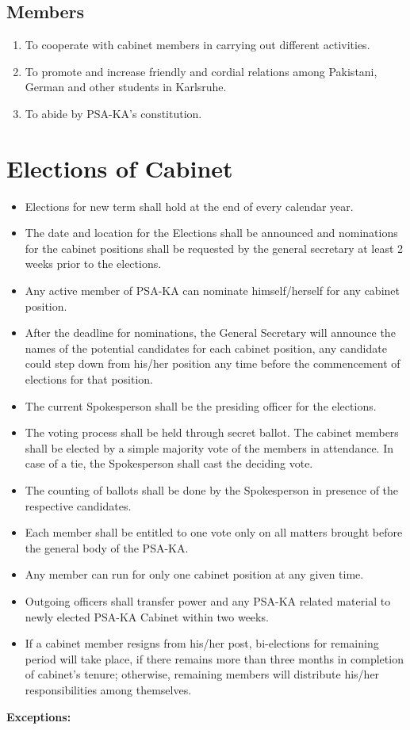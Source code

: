 \subsection{Members }
\begin{enumerate}
	\item To cooperate with cabinet members in carrying out different activities. 
	\item To promote and increase friendly and cordial relations among Pakistani, German and other students in Karlsruhe. 
	\item To abide by PSA-KA’s constitution. 
\end{enumerate}
\section{Elections of Cabinet }
\begin{itemize}
	\item Elections for new term shall hold at the end of every calendar year. 
	\item The date and location for the Elections shall be announced and nominations for the cabinet positions shall be requested by the general secretary at least 2 weeks prior to the elections. 
	\item Any active member of PSA-KA can nominate himself/herself for any cabinet position. 
	\item After the deadline for nominations, the General Secretary will announce the names of the potential candidates for each cabinet position, any candidate could step down from his/her position any time before the commencement of elections for that position. 
	\item The current Spokesperson shall be the presiding officer for the elections. 
	\item The voting process shall be held through secret ballot. The cabinet members shall be elected by a simple majority vote of the members in attendance. In case of a tie, the Spokesperson shall cast the deciding vote. 
	\item The counting of ballots shall be done by the Spokesperson in presence of the respective candidates. 
	\item Each member shall be entitled to one vote only on all matters brought before the general body of the PSA-KA. 
	\item Any member can run for only one cabinet position at any given time. 
	\item Outgoing officers shall transfer power and any PSA-KA related material to newly elected PSA-KA Cabinet within two weeks. 
	\item If a cabinet member resigns from his/her post, bi-elections for remaining period will take place, if there remains more than three months in completion of cabinet’s tenure; otherwise, remaining members will distribute his/her responsibilities among themselves.  
\end{itemize}
\textbf{Exceptions: }

